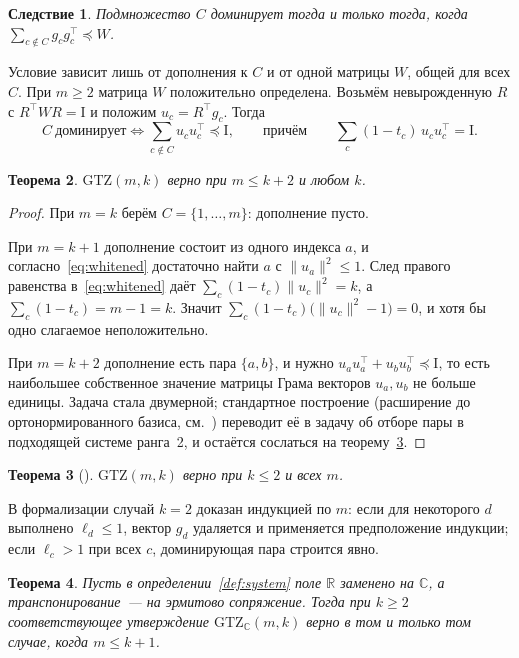 \documentclass[11pt,a4paper]{article}
\theoremstyle{plain}
\newtheorem{theorem}{Теорема}[section]
\newtheorem{corollary}[theorem]{Следствие}
\theoremstyle{definition}
\theoremstyle{remark}
\newcommand{\RR}{\mathbb{R}}
\newcommand{\CC}{\mathbb{C}}
\newcommand{\Id}{\mathrm{I}}
\newcommand{\GTZ}{\mathrm{GTZ}}
\newcommand{\T}{^{\!\top}}
\begin{document}
\begin{corollary}\label{cor:dual}
Подмножество $C$ доминирует тогда и только тогда, когда
$\sum_{c\notin C}g_cg_c\T\preceq W$.
\end{corollary}

Условие зависит лишь от дополнения к $C$ и от одной матрицы $W$, общей для
всех $C$. При $m\ge2$ матрица $W$ положительно определена. Возьмём
невырожденную $R$ с $R\T WR=\Id$ и положим $u_c=R\T g_c$. Тогда
\begin{equation}\label{eq:whitened}
  C\ \text{доминирует}\iff \sum_{c\notin C}u_cu_c\T\preceq\Id,
  \qquad\text{причём}\qquad \sum_c(1-t_c)\,u_cu_c\T=\Id .
\end{equation}

\begin{theorem}\label{thm:corank}
$\GTZ(m,k)$ верно при $m\le k+2$ и любом $k$.
\end{theorem}
\begin{proof}
При $m=k$ берём $C=\{1,\dots,m\}$: дополнение пусто.

При $m=k+1$ дополнение состоит из одного индекса $a$, и согласно~\eqref{eq:whitened}
достаточно найти $a$ с $\|u_a\|^2\le1$. След правого равенства
в~\eqref{eq:whitened} даёт $\sum_c(1-t_c)\|u_c\|^2=k$, а $\sum_c(1-t_c)=m-1=k$.
Значит $\sum_c(1-t_c)\bigl(\|u_c\|^2-1\bigr)=0$, и хотя бы одно слагаемое
неположительно.

При $m=k+2$ дополнение есть пара $\{a,b\}$, и нужно
$u_au_a\T+u_bu_b\T\preceq\Id$, то есть наибольшее собственное значение
матрицы Грама векторов $u_a,u_b$ не больше единицы. Задача стала двумерной;
стандартное построение (расширение до ортонормированного базиса, см.~\cite{main})
переводит её в задачу об отборе пары в подходящей системе ранга~2, и
остаётся сослаться на теорему~\ref{thm:ranktwo}.
\end{proof}

\begin{theorem}[\cite{airi}]\label{thm:ranktwo}
$\GTZ(m,k)$ верно при $k\le2$ и всех $m$.
\end{theorem}

В формализации случай $k=2$ доказан индукцией по $m$: если для некоторого
$d$ выполнено $\ell_d\le1$, вектор $g_d$ удаляется и применяется
предположение индукции; если $\ell_c>1$ при всех $c$, доминирующая пара
строится явно.

\begin{theorem}\label{thm:complex}
Пусть в определении~\ref{def:system} поле $\RR$ заменено на $\CC$, а
транспонирование~--- на эрмитово сопряжение. Тогда при $k\ge2$ соответствующее
утверждение $\GTZ_\CC(m,k)$ верно в том и только том случае, когда $m\le k+1$.
\end{theorem}
\end{document}
